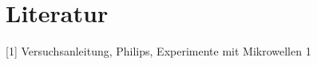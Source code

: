 \section{Literatur}
[1] Versuchsanleitung, Philips, Experimente mit Mikrowellen 1
























